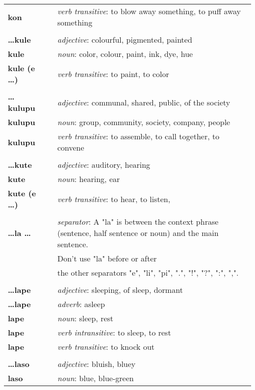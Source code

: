 \begin{supertabular}{p{2,5cm}|ll}
\textbf{kon} && \textit{verb transitive}: to blow away something, to puff away something \\ 
 && \\ %
\textbf{\dots kule} && \textit{adjective}: colourful, pigmented, painted \\ 
\textbf{kule} && \textit{noun}: color, colour, paint, ink, dye, hue \\ 
\textbf{kule (e \dots)} && \textit{verb transitive}: to paint, to color \\ 
 && \\ %
\textbf{\dots kulupu} && \textit{adjective}: communal, shared, public, of the society \\ 
\textbf{kulupu} && \textit{noun}: group, community, society, company, people \\ 
\textbf{kulupu } && \textit{verb transitive}: to assemble, to call together, to convene \\ 
 && \\ %
\textbf{\dots kute} && \textit{adjective}: auditory, hearing \\ 
\textbf{kute} && \textit{noun}: hearing, ear \\ 
\textbf{kute (e \dots)} && \textit{verb transitive}: to hear, to listen, \\ 
 && \\ %
\textbf{\dots la \dots} && \textit{separator}: A "la" is between the context phrase (sentence, half sentence or noun) and the main sentence. \\ && Don't use "la" before or after \\ && the other separators "e", "li", "pi", ".", "!", "?", ":", ",".  \\ 
 && \\ %
\textbf{\dots lape} && \textit{adjective}: sleeping, of sleep, dormant \\ 
\textbf{\dots lape} && \textit{adverb}: asleep \\ 
\textbf{lape} && \textit{noun}: sleep, rest \\ 
\textbf{lape} && \textit{verb intransitive}: to sleep, to rest \\ 
\textbf{lape } && \textit{verb transitive}: to knock out \\ 
 && \\ %
\textbf{\dots laso} && \textit{adjective}: bluish, bluey \\ 
\textbf{laso} && \textit{noun}: blue, blue-green \\ 

\end{supertabular}
